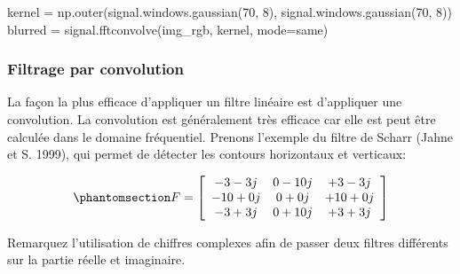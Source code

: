 \documentclass[
  11pt,
  letterpaper,
  open=any,
  twoside=false,
  french]{scrbook}
\newenvironment{Shaded}{\begin{snugshade}}{\end{snugshade}}
\newcommand{\DecValTok}[1]{\textcolor[rgb]{0.68,0.00,0.00}{#1}}
\newcommand{\NormalTok}[1]{\textcolor[rgb]{0.00,0.23,0.31}{#1}}
\newcommand{\OperatorTok}[1]{\textcolor[rgb]{0.37,0.37,0.37}{#1}}
\newcommand{\StringTok}[1]{\textcolor[rgb]{0.13,0.47,0.30}{#1}}
\begin{document}
\begin{Shaded}
\begin{Highlighting}[]
\NormalTok{kernel }\OperatorTok{=}\NormalTok{ np.outer(signal.windows.gaussian(}\DecValTok{70}\NormalTok{, }\DecValTok{8}\NormalTok{),}
\NormalTok{                  signal.windows.gaussian(}\DecValTok{70}\NormalTok{, }\DecValTok{8}\NormalTok{))}
\NormalTok{blurred }\OperatorTok{=}\NormalTok{ signal.fftconvolve(img\_rgb, kernel, mode}\OperatorTok{=}\StringTok{\textquotesingle{}same\textquotesingle{}}\NormalTok{)}
\end{Highlighting}
\end{Shaded}

\subsubsection{Filtrage par convolution}\label{filtrage-par-convolution}

La façon la plus efficace d'appliquer un filtre linéaire est d'appliquer
une convolution. La convolution est généralement très efficace car elle
est peut être calculée dans le domaine fréquentiel. Prenons l'exemple du
filtre de Scharr (Jahne et S. 1999), qui permet de détecter les contours
horizontaux et verticaux:

\begin{equation}\phantomsection\label{eq-scharr-filter}{
F= \left[
\begin{array}{ccc}
-3-3j & 0-10j & +3-3j \\
-10+0j & 0+0j & +10+0j \\
-3+3j & 0+10j & +3+3j
\end{array}
\right]
}\end{equation}

Remarquez l'utilisation de chiffres complexes afin de passer deux
filtres différents sur la partie réelle et imaginaire.
\end{document}
